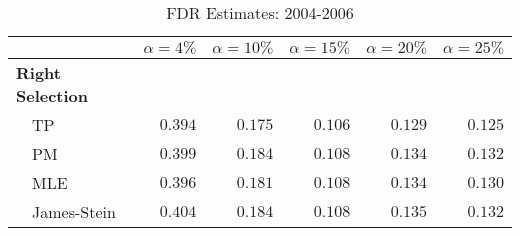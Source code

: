 \begin{table}[!tbp]
\begin{center}
\begin{tabular}{lrrrrr}
\hline\hline
\multicolumn{1}{l}{}&\multicolumn{1}{c}{$\alpha=4\%$}&\multicolumn{1}{c}{$\alpha=10\%$}&\multicolumn{1}{c}{$\alpha=15\%$}&\multicolumn{1}{c}{$\alpha=20\%$}&\multicolumn{1}{c}{$\alpha=25\%$}\tabularnewline
\hline
{\bfseries Right Selection}&&&&&\tabularnewline
~~TP&$0.394$&$0.175$&$0.106$&$0.129$&$0.125$\tabularnewline
~~PM&$0.399$&$0.184$&$0.108$&$0.134$&$0.132$\tabularnewline
~~MLE&$0.396$&$0.181$&$0.108$&$0.134$&$0.130$\tabularnewline
~~James-Stein&$0.404$&$0.184$&$0.108$&$0.135$&$0.132$\tabularnewline
\hline
\end{tabular}
\caption{FDR Estimates: 2004-2006\label{tab: naive_31_1d}}\end{center}
\end{table}

